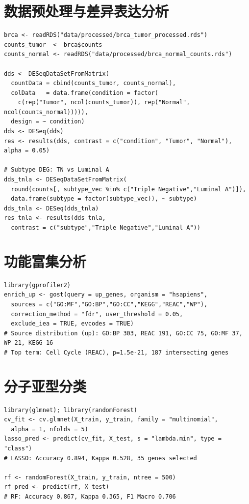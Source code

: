 \documentclass[12pt,a4paper,openany]{ctexbook}
\begin{document}
\section{数据预处理与差异表达分析}
\begin{lstlisting}[caption={mRNA预处理与DESeq2差异表达}, basicstyle=\ttfamily\scriptsize]
brca <- readRDS("data/processed/brca_tumor_processed.rds")
counts_tumor  <- brca$counts
counts_normal <- readRDS("data/processed/brca_normal_counts.rds")

dds <- DESeqDataSetFromMatrix(
  countData = cbind(counts_tumor, counts_normal),
  colData   = data.frame(condition = factor(
    c(rep("Tumor", ncol(counts_tumor)), rep("Normal", ncol(counts_normal))))),
  design = ~ condition)
dds <- DESeq(dds)
res <- results(dds, contrast = c("condition", "Tumor", "Normal"), alpha = 0.05)

# Subtype DEG: TN vs Luminal A
dds_tnla <- DESeqDataSetFromMatrix(
  round(counts[, subtype_vec %in% c("Triple Negative","Luminal A")]),
  data.frame(subtype = factor(subtype_vec)), ~ subtype)
dds_tnla <- DESeq(dds_tnla)
res_tnla <- results(dds_tnla,
  contrast = c("subtype","Triple Negative","Luminal A"))
\end{lstlisting}

\section{功能富集分析}
\begin{lstlisting}[caption={g:Profiler功能富集}, basicstyle=\ttfamily\scriptsize]
library(gprofiler2)
enrich_up <- gost(query = up_genes, organism = "hsapiens",
  sources = c("GO:MF","GO:BP","GO:CC","KEGG","REAC","WP"),
  correction_method = "fdr", user_threshold = 0.05,
  exclude_iea = TRUE, evcodes = TRUE)
# Source distribution (up): GO:BP 303, REAC 191, GO:CC 75, GO:MF 37, WP 21, KEGG 16
# Top term: Cell Cycle (REAC), p=1.5e-21, 187 intersecting genes
\end{lstlisting}

\section{分子亚型分类}
\begin{lstlisting}[caption={LASSO与随机森林分类}, basicstyle=\ttfamily\scriptsize]
library(glmnet); library(randomForest)
cv_fit <- cv.glmnet(X_train, y_train, family = "multinomial",
  alpha = 1, nfolds = 5)
lasso_pred <- predict(cv_fit, X_test, s = "lambda.min", type = "class")
# LASSO: Accuracy 0.894, Kappa 0.528, 35 genes selected

rf <- randomForest(X_train, y_train, ntree = 500)
rf_pred <- predict(rf, X_test)
# RF: Accuracy 0.867, Kappa 0.365, F1 Macro 0.706
\end{lstlisting}
\end{document}
